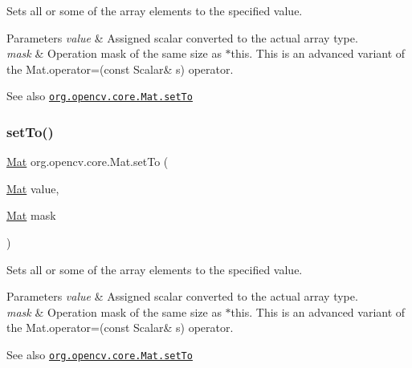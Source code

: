 Sets all or some of the array elements to the specified value.


\begin{DoxyParams}{Parameters}
{\em value} & Assigned scalar converted to the actual array type. \\
\hline
{\em mask} & Operation mask of the same size as {\ttfamily $\ast$this}. This is an advanced variant of the {\ttfamily Mat.\+operator=(const Scalar\& s)} operator.\\
\hline
\end{DoxyParams}
\begin{DoxySeeAlso}{See also}
\href{http://docs.opencv.org/modules/core/doc/basic_structures.html#mat-setto}{\tt org.\+opencv.\+core.\+Mat.\+set\+To} 
\end{DoxySeeAlso}
\mbox{\label{classorg_1_1opencv_1_1core_1_1_mat_a793ccddcd93d47402e9b243ef75814b1}} 
\subsubsection{\texorpdfstring{set\+To()}{setTo()}\hspace{0.1cm}{\footnotesize\ttfamily [3/4]}}
{\footnotesize\ttfamily \mbox{\hyperlink{classorg_1_1opencv_1_1core_1_1_mat}{Mat}} org.\+opencv.\+core.\+Mat.\+set\+To (\begin{DoxyParamCaption}\item[{\mbox{\hyperlink{classorg_1_1opencv_1_1core_1_1_mat}{Mat}}}]{value,  }\item[{\mbox{\hyperlink{classorg_1_1opencv_1_1core_1_1_mat}{Mat}}}]{mask }\end{DoxyParamCaption})}

Sets all or some of the array elements to the specified value.


\begin{DoxyParams}{Parameters}
{\em value} & Assigned scalar converted to the actual array type. \\
\hline
{\em mask} & Operation mask of the same size as {\ttfamily $\ast$this}. This is an advanced variant of the {\ttfamily Mat.\+operator=(const Scalar\& s)} operator.\\
\hline
\end{DoxyParams}
\begin{DoxySeeAlso}{See also}
\href{http://docs.opencv.org/modules/core/doc/basic_structures.html#mat-setto}{\tt org.\+opencv.\+core.\+Mat.\+set\+To} 
\end{DoxySeeAlso}
\mbox{\label{classorg_1_1opencv_1_1core_1_1_mat_a3c0458f17815dd73f81e4a8dfebacb3b}} 
